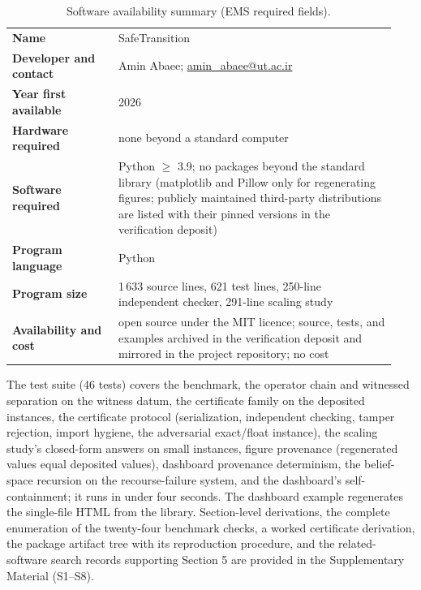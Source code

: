 \documentclass[3p,11pt]{elsarticle}
\begin{document}
\begin{table}[h]
\centering
\small
\begin{tabular}{@{}p{0.26\linewidth}p{0.68\linewidth}@{}}
\toprule
\textbf{Name} & SafeTransition \\
\textbf{Developer and contact} & Amin Abaee;
\href{mailto:amin_abaee@ut.ac.ir}{amin\_abaee@ut.ac.ir} \\
\textbf{Year first available} & 2026 \\
\textbf{Hardware required} & none beyond a standard computer \\
\textbf{Software required} & Python $\geq$ 3.9; no packages beyond the
standard library (matplotlib and Pillow only for regenerating figures;
publicly maintained third-party distributions are listed with their pinned
versions in the verification deposit) \\
\textbf{Program language} & Python \\
\textbf{Program size} & 1\,633 source lines, 621 test lines, 250-line
independent checker, 291-line scaling study \\
\textbf{Availability and cost} & open source under the MIT licence; source,
tests, and examples archived in the verification deposit \citep{Deposit2026}
and mirrored in the project repository; no cost \\
\bottomrule
\end{tabular}
\caption{Software availability summary (EMS required fields).}
\label{tab:availability}
\end{table}

The test suite (46 tests) covers the benchmark, the operator chain and
witnessed separation on the witness datum, the certificate family on the
deposited instances, the certificate protocol (serialization, independent
checking, tamper rejection, import hygiene, the adversarial exact/float
instance), the scaling study's closed-form answers on small instances,
figure provenance (regenerated values equal deposited values), dashboard
provenance determinism, the belief-space recursion on the recourse-failure
system, and the dashboard's self-containment; it runs in under four
seconds.
The dashboard example regenerates the single-file HTML from the library.
Section-level derivations, the complete enumeration of the twenty-four
benchmark checks, a worked certificate derivation, the package artifact
tree with its reproduction procedure, and the related-software search
records supporting Section 5 are provided in the Supplementary Material
(S1--S8).
\end{document}
